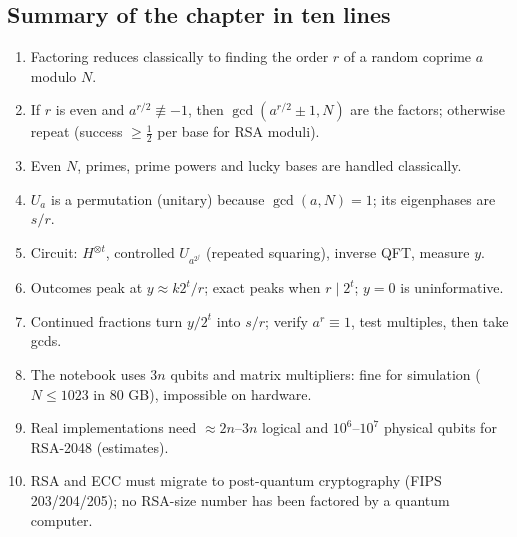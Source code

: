 \documentclass[11pt,a4paper,openany]{book}
\begin{document}
\subsection*{Summary of the chapter in ten lines}
\begin{enumerate}[itemsep=1pt]
\item Factoring reduces classically to finding the order $r$ of a random coprime $a$ modulo $N$.
\item If $r$ is even and $a^{r/2} \not\equiv -1$, then $\gcd(a^{r/2} \pm 1, N)$ are the factors; otherwise repeat (success $\ge \frac12$ per base for RSA moduli).
\item Even $N$, primes, prime powers and lucky bases are handled classically.
\item $U_a$ is a permutation (unitary) because $\gcd(a, N) = 1$; its eigenphases are $s/r$.
\item Circuit: $H^{\otimes t}$, controlled $U_{a^{2^j}}$ (repeated squaring), inverse QFT, measure $y$.
\item Outcomes peak at $y \approx k2^t/r$; exact peaks when $r \mid 2^t$; $y = 0$ is uninformative.
\item Continued fractions turn $y/2^t$ into $s/r$; verify $a^r \equiv 1$, test multiples, then take gcds.
\item The notebook uses $3n$ qubits and matrix multipliers: fine for simulation ($N \le 1023$ in 80 GB), impossible on hardware.
\item Real implementations need $\approx2n$--$3n$ logical and $10^6$--$10^7$ physical qubits for RSA-2048 (estimates).
\item RSA and ECC must migrate to post-quantum cryptography (FIPS 203/204/205); no RSA-size number has been factored by a quantum computer.
\end{enumerate}
\end{document}
